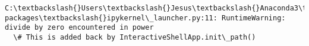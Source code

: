 \documentclass[11pt]{article}
\begin{document}
    \begin{Verbatim}[commandchars=\\\{\}]
C:\textbackslash{}Users\textbackslash{}Jesus\textbackslash{}Anaconda3\textbackslash{}lib\textbackslash{}site-packages\textbackslash{}ipykernel\_launcher.py:11: RuntimeWarning: divide by zero encountered in power
  \# This is added back by InteractiveShellApp.init\_path()

    \end{Verbatim}

    \begin{center}
    \end{center}
    { \hspace*{\fill} \\}
    
\end{document}

